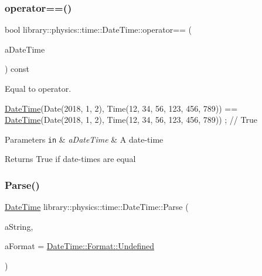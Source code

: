 \subsubsection{\texorpdfstring{operator==()}{operator==()}}
{\footnotesize\ttfamily bool library\+::physics\+::time\+::\+Date\+Time\+::operator== (\begin{DoxyParamCaption}\item[{const \hyperlink{classlibrary_1_1physics_1_1time_1_1_date_time}{Date\+Time} \&}]{a\+Date\+Time }\end{DoxyParamCaption}) const}



Equal to operator. 


\begin{DoxyCode}
\hyperlink{classlibrary_1_1physics_1_1time_1_1_date_time_a4ea629e533f335c928e037c4ead4646e}{DateTime}(Date(2018, 1, 2), Time(12, 34, 56, 123, 456, 789)) == \hyperlink{classlibrary_1_1physics_1_1time_1_1_date_time_a4ea629e533f335c928e037c4ead4646e}{DateTime}(Date(2018, 1, 2), 
      Time(12, 34, 56, 123, 456, 789)) ; \textcolor{comment}{// True}
\end{DoxyCode}



\begin{DoxyParams}[1]{Parameters}
\mbox{\tt in}  & {\em a\+Date\+Time} & A date-\/time \\
\hline
\end{DoxyParams}
\begin{DoxyReturn}{Returns}
True if date-\/times are equal 
\end{DoxyReturn}
\mbox{\label{classlibrary_1_1physics_1_1time_1_1_date_time_ae14e7677611cf32f61e57a874d31c0be}} 
\subsubsection{\texorpdfstring{Parse()}{Parse()}}
{\footnotesize\ttfamily \hyperlink{classlibrary_1_1physics_1_1time_1_1_date_time}{Date\+Time} library\+::physics\+::time\+::\+Date\+Time\+::\+Parse (\begin{DoxyParamCaption}\item[{const String \&}]{a\+String,  }\item[{const \hyperlink{classlibrary_1_1physics_1_1time_1_1_date_time_a99e6afd988c9b091b1540d707922c804}{Date\+Time\+::\+Format} \&}]{a\+Format = {\ttfamily \hyperlink{classlibrary_1_1physics_1_1time_1_1_date_time_a99e6afd988c9b091b1540d707922c804aec0fc0100c4fc1ce4eea230c3dc10360}{Date\+Time\+::\+Format\+::\+Undefined}} }\end{DoxyParamCaption})\hspace{0.3cm}{\ttfamily [static]}}



